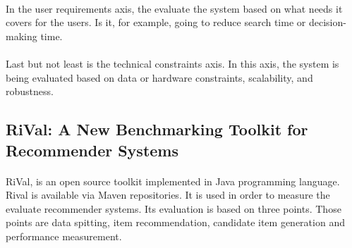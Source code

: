 \paragraph{}In the user requirements axis, the evaluate the system based on what needs it covers for the users. Is it, for example, going to reduce search time or decision-making time.

\paragraph{}Last but not least is the technical constraints axis. In this axis, the system is being evaluated based on data or hardware constraints, scalability, and robustness.

\subsection{RiVal: A New Benchmarking Toolkit for Recommender Systems \cite{said2014rival}}
\paragraph{} RiVal, is an open source toolkit implemented in Java programming language. Rival is available via Maven repositories. It is used in order to measure the evaluate recommender systems. Its evaluation is based on three points. Those points are data spitting, item recommendation, candidate item generation and performance measurement. 
